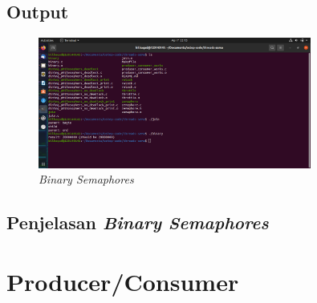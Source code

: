 \documentclass[11pt,a4paper]{article}
\begin{document}
\subsection{Output}
\begin{figure}[h]
	\centering
	\includegraphics[width=0.8\textwidth]{Figure1/binary.png}
	\caption{\textit{Binary Semaphores}}
\end{figure}

\subsection{Penjelasan \textit{Binary Semaphores}}

\section{Producer/Consumer}
\end{document}
